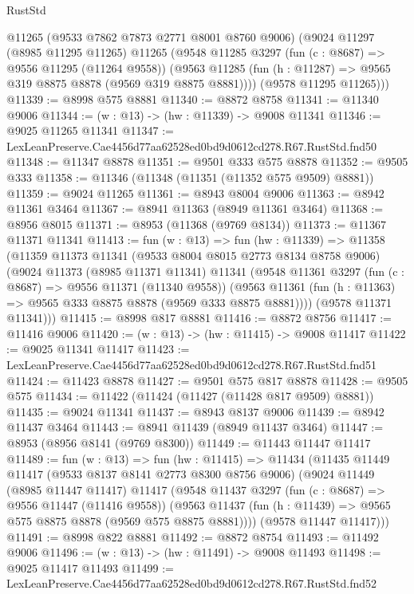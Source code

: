 \begin{lexlean}{RustStd}
\begin{coremodule}
      @11265
      (@9533 @7862 @7873 @2771 @8001 @8760 @9006)
      (@9024
        @11297
        (@8985 @11295 @11265)
        @11265
        (@9548
          @11285
          @3297
          (fun (c : @8687) => @9556 @11295 (@11264 @9558))
          (@9563 @11285 (fun (h : @11287) => @9565 @319 @8875 @8878 (@9569 @319 @8875 @8881))))
        (@9578 @11295 @11265)))
@11339 := @8998 @575 @8881
@11340 := @8872 @8758
@11341 := @11340 @9006
@11344 := (w : @13) -> (hw : @11339) -> @9008 @11341
@11346 := @9025 @11265 @11341
@11347 := LexLeanPreserve.Cae4456d77aa62528ed0bd9d0612cd278.R67.RustStd.fnd50
@11348 := @11347 @8878
@11351 := @9501 @333 @575 @8878
@11352 := @9505 @333
@11358 := @11346 (@11348 (@11351 (@11352 @575 @9509) @8881))
@11359 := @9024 @11265
@11361 := @8943 @8004 @9006
@11363 := @8942 @11361 @3464
@11367 := @8941 @11363 (@8949 @11361 @3464)
@11368 := @8956 @8015
@11371 := @8953 (@11368 (@9769 @8134))
@11373 := @11367 @11371 @11341
@11413 := fun (w : @13) =>
  fun (hw : @11339) =>
  @11358
    (@11359
      @11373
      @11341
      (@9533 @8004 @8015 @2773 @8134 @8758 @9006)
      (@9024
        @11373
        (@8985 @11371 @11341)
        @11341
        (@9548
          @11361
          @3297
          (fun (c : @8687) => @9556 @11371 (@11340 @9558))
          (@9563 @11361 (fun (h : @11363) => @9565 @333 @8875 @8878 (@9569 @333 @8875 @8881))))
        (@9578 @11371 @11341)))
@11415 := @8998 @817 @8881
@11416 := @8872 @8756
@11417 := @11416 @9006
@11420 := (w : @13) -> (hw : @11415) -> @9008 @11417
@11422 := @9025 @11341 @11417
@11423 := LexLeanPreserve.Cae4456d77aa62528ed0bd9d0612cd278.R67.RustStd.fnd51
@11424 := @11423 @8878
@11427 := @9501 @575 @817 @8878
@11428 := @9505 @575
@11434 := @11422 (@11424 (@11427 (@11428 @817 @9509) @8881))
@11435 := @9024 @11341
@11437 := @8943 @8137 @9006
@11439 := @8942 @11437 @3464
@11443 := @8941 @11439 (@8949 @11437 @3464)
@11447 := @8953 (@8956 @8141 (@9769 @8300))
@11449 := @11443 @11447 @11417
@11489 := fun (w : @13) =>
  fun (hw : @11415) =>
  @11434
    (@11435
      @11449
      @11417
      (@9533 @8137 @8141 @2773 @8300 @8756 @9006)
      (@9024
        @11449
        (@8985 @11447 @11417)
        @11417
        (@9548
          @11437
          @3297
          (fun (c : @8687) => @9556 @11447 (@11416 @9558))
          (@9563 @11437 (fun (h : @11439) => @9565 @575 @8875 @8878 (@9569 @575 @8875 @8881))))
        (@9578 @11447 @11417)))
@11491 := @8998 @822 @8881
@11492 := @8872 @8754
@11493 := @11492 @9006
@11496 := (w : @13) -> (hw : @11491) -> @9008 @11493
@11498 := @9025 @11417 @11493
@11499 := LexLeanPreserve.Cae4456d77aa62528ed0bd9d0612cd278.R67.RustStd.fnd52

\end{coremodule}
\end{lexlean}
